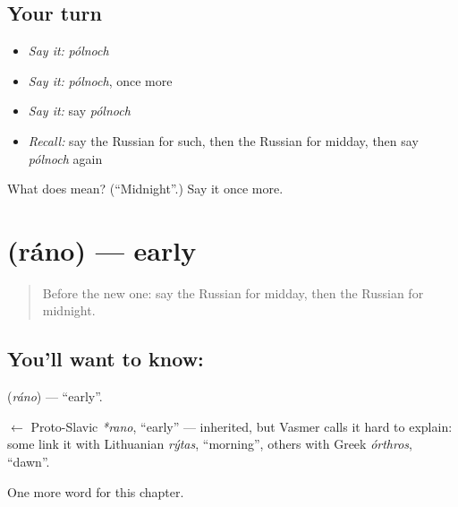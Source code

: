 \subsection*{Your turn}
\begin{itemize}
\raggedright
  \item \emph{Say it:} \emph{pólnoch}
  \item \emph{Say it:} \emph{pólnoch}, once more
  \item \emph{Say it:} say \emph{pólnoch}
  \item \emph{Recall:} say the Russian for such, then the Russian for midday, then say \emph{pólnoch} again
\end{itemize}

\begin{tcolorbox}[breakable,colback=teal!4,colframe=teal!35!black,title={Before you move on}]
What does  mean? (\textquotedblleft{}Midnight\textquotedblright{}.) Say it once more.
\end{tcolorbox}
\section[\texorpdfstring{\ru{рано} (ráno)}{рано (ráno)}]{ (ráno) — early}

\label{lesson:RU-C83-early}



\begin{quote}
Before the new one: say the Russian for midday, then the Russian for midnight.
\end{quote}

\subsection*{You'll want to know: }
\textbf{} (\emph{ráno}) — \textquotedblleft{}early\textquotedblright{}.

\begin{cousinweb}
\textbf{} $\leftarrow$ Proto-Slavic \emph{*rano}, \textquotedblleft{}early\textquotedblright{} — inherited, but Vasmer calls it hard to explain: some link it with Lithuanian \emph{rýtas}, \textquotedblleft{}morning\textquotedblright{}, others with Greek \emph{órthros}, \textquotedblleft{}dawn\textquotedblright{}.
\end{cousinweb}

\begin{grammarlens}[title={What you've built}]
One more word for this chapter.
\end{grammarlens}

